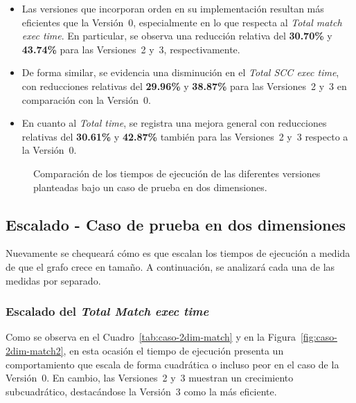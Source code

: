 \begin{itemize}
    \item Las versiones que incorporan orden en su implementación resultan más eficientes que la Versión~0, especialmente en lo que respecta al \textit{Total match exec time}. En particular, se observa una reducción relativa del \textbf{30{.}70\%} y \textbf{43{.}74\%} para las Versiones~2 y~3, respectivamente.

    \item De forma similar, se evidencia una disminución en el \textit{Total SCC exec time}, con reducciones relativas del \textbf{29{.}96\%} y \textbf{38{.}87\%} para las Versiones~2 y~3 en comparación con la Versión~0.

    \item En cuanto al \textit{Total time}, se registra una mejora general con reducciones relativas del \textbf{30{.}61\%} y \textbf{42{.}87\%} también para las Versiones~2 y~3 respecto a la Versión~0.
\end{itemize}


\begin{figure}[htbp]
  \centering
  \caption{Comparación de los tiempos de ejecución de las diferentes versiones planteadas bajo un caso de prueba en dos dimensiones.}
  \label{fig:caso-2dim-general}
\end{figure}

\subsection{Escalado - Caso de prueba en dos dimensiones}

Nuevamente se chequeará cómo es que escalan los tiempos de ejecución a medida de que el grafo crece en tamaño. A continuación, se analizará cada una de las medidas por separado.

\subsubsection{Escalado del \textit{Total Match exec time}}

Como se observa en el Cuadro~\ref{tab:caso-2dim-match} y en la Figura~\ref{fig:caso-2dim-match2}, en esta ocasión el tiempo de ejecución presenta un comportamiento que escala de forma cuadrática o incluso peor en el caso de la Versión~0. En cambio, las Versiones~2 y~3 muestran un crecimiento subcuadrático, destacándose la Versión~3 como la más eficiente.

